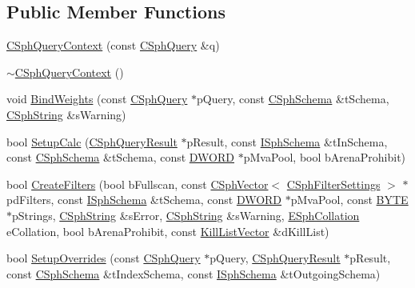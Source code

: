 \subsection*{Public Member Functions}
\begin{DoxyCompactItemize}
\item 
\hyperlink{classCSphQueryContext_a15e8de278af5d5646f63363e07559c9b}{C\-Sph\-Query\-Context} (const \hyperlink{classCSphQuery}{C\-Sph\-Query} \&q)
\item 
\hyperlink{classCSphQueryContext_a6b5f859f3d0a02529296220592fbf9a1}{$\sim$\-C\-Sph\-Query\-Context} ()
\item 
void \hyperlink{classCSphQueryContext_a60c73f239769158c55863b76061aab6d}{Bind\-Weights} (const \hyperlink{classCSphQuery}{C\-Sph\-Query} $\ast$p\-Query, const \hyperlink{classCSphSchema}{C\-Sph\-Schema} \&t\-Schema, \hyperlink{structCSphString}{C\-Sph\-String} \&s\-Warning)
\item 
bool \hyperlink{classCSphQueryContext_aa18a365eddaad8999ae25d0e313e352b}{Setup\-Calc} (\hyperlink{classCSphQueryResult}{C\-Sph\-Query\-Result} $\ast$p\-Result, const \hyperlink{classISphSchema}{I\-Sph\-Schema} \&t\-In\-Schema, const \hyperlink{classCSphSchema}{C\-Sph\-Schema} \&t\-Schema, const \hyperlink{sphinxstd_8h_a798af1e30bc65f319c1a246cecf59e39}{D\-W\-O\-R\-D} $\ast$p\-Mva\-Pool, bool b\-Arena\-Prohibit)
\item 
bool \hyperlink{classCSphQueryContext_a6b415f84617d1086fcf47054debbf3bf}{Create\-Filters} (bool b\-Fullscan, const \hyperlink{classCSphVector}{C\-Sph\-Vector}$<$ \hyperlink{classCSphFilterSettings}{C\-Sph\-Filter\-Settings} $>$ $\ast$pd\-Filters, const \hyperlink{classISphSchema}{I\-Sph\-Schema} \&t\-Schema, const \hyperlink{sphinxstd_8h_a798af1e30bc65f319c1a246cecf59e39}{D\-W\-O\-R\-D} $\ast$p\-Mva\-Pool, const \hyperlink{sphinxstd_8h_a4ae1dab0fb4b072a66584546209e7d58}{B\-Y\-T\-E} $\ast$p\-Strings, \hyperlink{structCSphString}{C\-Sph\-String} \&s\-Error, \hyperlink{structCSphString}{C\-Sph\-String} \&s\-Warning, \hyperlink{sphinxexpr_8h_a78197b7b74319074237ecaf5d99cfbe5}{E\-Sph\-Collation} e\-Collation, bool b\-Arena\-Prohibit, const \hyperlink{sphinx_8h_a1510ca22159d6c94f7fd300b5d3be431}{Kill\-List\-Vector} \&d\-Kill\-List)
\item 
bool \hyperlink{classCSphQueryContext_a4dfcf23195f97bdb80be5ecefdf3d07f}{Setup\-Overrides} (const \hyperlink{classCSphQuery}{C\-Sph\-Query} $\ast$p\-Query, \hyperlink{classCSphQueryResult}{C\-Sph\-Query\-Result} $\ast$p\-Result, const \hyperlink{classCSphSchema}{C\-Sph\-Schema} \&t\-Index\-Schema, const \hyperlink{classISphSchema}{I\-Sph\-Schema} \&t\-Outgoing\-Schema)

\end{DoxyCompactItemize}
